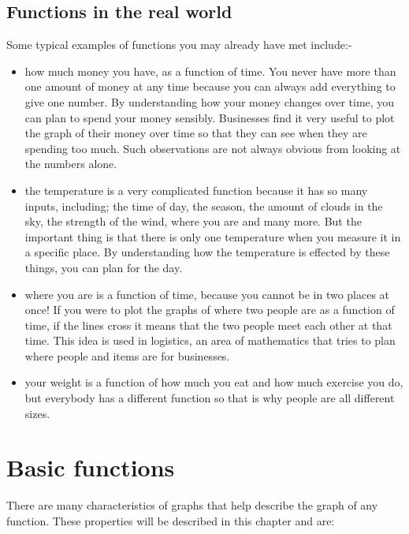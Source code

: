 \subsection*{Functions in the real world}
\nopagebreak
Some typical examples of functions you may already have met
include:-\par 
\begin{itemize}[noitemsep]
\item how much money you have, as a function of time. You never have more than one amount of money at any time because you can always add everything to give one number. By understanding how your money changes over time, you can plan to spend your money sensibly. Businesses find it very useful to plot the graph of their money over time so that they can see when they are spending too much. Such observations are not always obvious from looking at the numbers alone.
\item the temperature is a very complicated function because it has so many inputs, including; the time of day, the season, the amount of clouds in the sky, the strength of the wind, where you are and many more. But the important thing is that there is only one temperature when you measure it in a specific place. By understanding how the temperature is effected by these things, you can plan
for the day.
\item where you are is a function of time, because you cannot be in two places at once! If you were to plot the graphs of where two people are as a function of time, if the lines cross it means that the two people meet each other at that time. This idea is used in logistics, an area of mathematics that tries to plan where people and items are for businesses.
\item your weight is a function of how much you eat and how much exercise you do, but everybody has a different function so that is why people are all different sizes.
\end{itemize}

\section{Basic functions}
\nopagebreak
There are many characteristics of graphs that help describe the graph of any function. These properties will be described in this chapter and are:\par 

